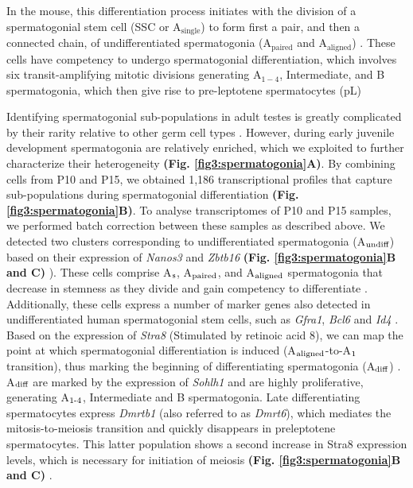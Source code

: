 In the mouse, this differentiation process initiates with the division of a spermatogonial stem cell (SSC or A$_{\text{single}}$) to form first a pair, and then a connected chain, of undifferentiated spermatogonia (A$_{\text{paired}}$ and A$_{\text{aligned}}$) \citep{Oakberg1971, DeRooij1973}. These cells have competency to undergo spermatogonial differentiation, which involves six transit-amplifying mitotic divisions generating A$_{1-4}$, Intermediate, and B spermatogonia, which then give rise to pre-leptotene spermatocytes (pL) \citep{DeRooij2000}

Identifying spermatogonial sub-populations in adult testes is greatly complicated by their rarity relative to other germ cell types \citep{Lukassen2018}. However, during early juvenile development spermatogonia are relatively enriched, which we exploited to further characterize their heterogeneity \textbf{(Fig. \ref{fig3:spermatogonia}A)}. By combining cells from P10 and P15, we obtained 1,186 transcriptional profiles that capture sub-populations during spermatogonial differentiation \textbf{(Fig. \ref{fig3:spermatogonia}B)}. To analyse transcriptomes of P10 and P15 samples, we performed batch correction between these samples as described above. We detected two clusters corresponding to undifferentiated spermatogonia (A$_\textnormal{undiff}$) based on their expression of \textit{Nanos3} and \textit{Zbtb16} \textbf{(Fig. \ref{fig3:spermatogonia}B and C)} \citep{Buaas2004, Lolicato2008}). These cells comprise A$_\textnormal{s}$, A$_\textnormal{paired}$, and A$_\textnormal{aligned}$ spermatogonia that decrease in stemness as they divide and gain competency to differentiate \citep{Suzuki2012}. Additionally, these cells express a number of marker genes also detected in undifferentiated human spermatogonial stem cells, such as \textit{Gfra1}, \textit{Bcl6} and \textit{Id4} \citep{Guo2017}. Based on the expression of \textit{Stra8} (Stimulated by retinoic acid 8), we can map the point at which spermatogonial differentiation is induced (A$_\textnormal{aligned}$-to-A$_\textnormal{1}$ transition), thus marking the beginning of differentiating spermatogonia (A$_\textnormal{diff}$) \citep{Endo2015}. A$_\textnormal{diff}$ are marked by the expression of \textit{Sohlh1} \citep{Ballow2006} and are highly proliferative, generating A$_\textnormal{1-4}$, Intermediate and B spermatogonia. Late differentiating spermatocytes express \textit{Dmrtb1} (also referred to as \textit{Dmrt6}), which mediates the mitosis-to-meiosis transition and quickly disappears in preleptotene spermatocytes. This latter population shows a second increase in Stra8 expression levels, which is necessary for initiation of meiosis \textbf{(Fig. \ref{fig3:spermatogonia}B and C)} \citep{Anderson2008, Endo2015, Zhang2014}. 

